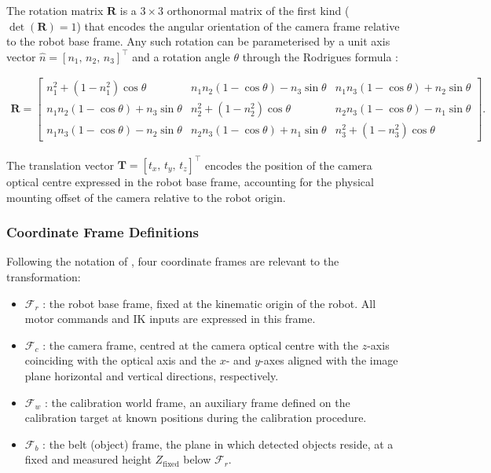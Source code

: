 \hspace{1.27cm}
The rotation matrix $\mathbf{R}$ is a $3 \times 3$ orthonormal
matrix of the first kind ($\det(\mathbf{R}) = 1$) that encodes
the angular orientation of the camera frame relative to the robot
base frame. Any such rotation can be parameterised by a unit
axis vector $\hat{n} = [n_1,\, n_2,\, n_3]^{\top}$ and a
rotation angle $\theta$ through the Rodrigues formula
\autocite{tsai-lenz-1989}:

\begin{multline}
    \mathbf{R} =
    \begin{bmatrix}
        n_1^2 + (1-n_1^2)\cos\theta &
        n_1 n_2(1-\cos\theta) - n_3\sin\theta &
        n_1 n_3(1-\cos\theta) + n_2\sin\theta \\[4pt]
        n_1 n_2(1-\cos\theta) + n_3\sin\theta &
        n_2^2 + (1-n_2^2)\cos\theta &
        n_2 n_3(1-\cos\theta) - n_1\sin\theta \\[4pt]
        n_1 n_3(1-\cos\theta) - n_2\sin\theta &
        n_2 n_3(1-\cos\theta) + n_1\sin\theta &
        n_3^2 + (1-n_3^2)\cos\theta
    \end{bmatrix}.
    \label{eq:rodrigues}
\end{multline}

The translation vector $\mathbf{T} = [t_x,\, t_y,\, t_z]^{\top}$
encodes the position of the camera optical centre expressed in
the robot base frame, accounting for the physical mounting offset
of the camera relative to the robot origin.

\subsubsection{Coordinate Frame Definitions}
\hspace{1.27cm}
Following the notation of \autocite{tsai-lenz-1989}, four
coordinate frames are relevant to the transformation:

\begin{itemize}
    \item $\mathcal{F}_r$ : the robot base frame,
    fixed at the kinematic origin of the robot. All motor commands
    and IK inputs are expressed in this frame.
    \item $\mathcal{F}_c$ : the camera frame, centred
    at the camera optical centre with the $z$-axis coinciding
    with the optical axis and the $x$- and $y$-axes aligned with
    the image plane horizontal and vertical directions,
    respectively.
    \item $\mathcal{F}_w$ : the calibration world frame,
    an auxiliary frame defined on the calibration target at known
    positions during the calibration procedure.
    \item $\mathcal{F}_b$ : the belt (object) frame,
    the plane in which detected objects reside, at a fixed and
    measured height $Z_{\text{fixed}}$ below $\mathcal{F}_r$.
\end{itemize}

